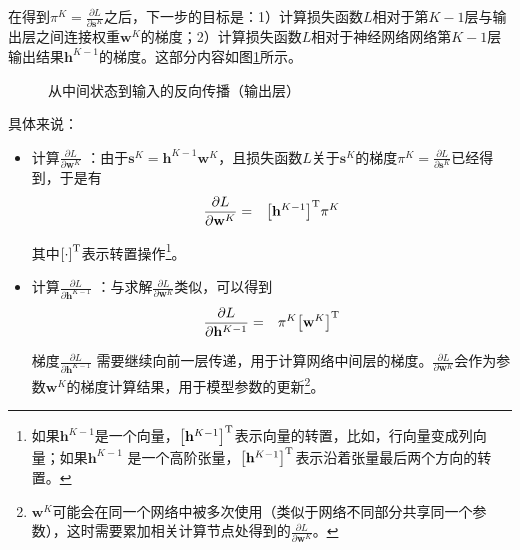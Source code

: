 \parinterval  在得到$ {\pi}^K= \frac{\partial L}{\partial \mathbf s^K} $之后，下一步的目标是：1）计算损失函数$ L $相对于第$ K-1 $层与输出层之间连接权重$ \mathbf w^K $的梯度；2）计算损失函数$ L $相对于神经网络网络第$ K-1 $层输出结果$ \mathbf h^{K-1} $的梯度。这部分内容如图\ref{fig:5-55}所示。

\begin{figure}[htp]
\centering

\caption{从中间状态到输入的反向传播（输出层）}
\label{fig:5-55}
\end{figure}

\noindent  具体来说：

\begin{itemize}
\vspace{0.5em}
\item 计算$ \frac{\partial L}{\partial \mathbf w^K} $ ：由于$ \mathbf s^K=\mathbf h^{K-1}\mathbf w^K $，且损失函数$ L $关于$ \mathbf s^K $的梯度$ {\pi}^K= \frac{\partial L}{\partial \mathbf s^K} $已经得到，于是有
\begin{eqnarray}
\frac{\partial L}{\partial \mathbf w^K}&=&{\left[\mathbf h^{K-1}\right]}^{\rm T} {\pi}^K
\label{eq:5-50}
\end{eqnarray}

其中${[\cdot]}^{\rm T}$表示转置操作\footnote{如果$ \mathbf h^{K-1} $是一个向量，$ {\left[\mathbf h^{K-1}\right]}^{\rm T} $表示向量的转置，比如，行向量变成列向量；如果$ \mathbf h^{K-1} $ 是一个高阶张量，$ {\left[\mathbf h^{K-1}\right]}^{\rm T} $表示沿着张量最后两个方向的转置。}。
\vspace{0.5em}
\item 计算$ \frac{\partial L}{\partial \mathbf h^{K-1}} $ ：与求解$ \frac{\partial L}{\partial \mathbf w^K} $类似，可以得到
\begin{eqnarray}
\frac{\partial L}{\partial \mathbf h^{K-1}}&=&{\pi}^K{\left[\mathbf w^K\right]}^{\rm T}
\label{eq:5-51}
\end{eqnarray}

梯度$ \frac{\partial L}{\partial \mathbf h^{K-1}} $ 需要继续向前一层传递，用于计算网络中间层的梯度。$ \frac{\partial L}{\partial \mathbf w^K} $会作为参数$ \mathbf w^K $的梯度计算结果，用于模型参数的更新\footnote{$ \mathbf w^K $可能会在同一个网络中被多次使用（类似于网络不同部分共享同一个参数），这时需要累加相关计算节点处得到的$ \frac{\partial L}{\partial \mathbf w^K} $。}。
\vspace{0.5em}
\end{itemize}

